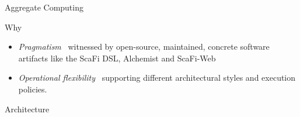 \documentclass[presentation, 9pt]{beamer}\mode<presentation>{\usetheme{AMSBolognaFC}}
\begin{document}
\begin{frame}[allowframebreaks]{Aggregate Computing}
\begin{block}{Why}
\begin{itemize}
	\item \emph{Pragmatism} \faArrowRight \, witnessed by open-source, maintained, concrete software artifacts like the ScaFi DSL, Alchemist and {\sc{}ScaFi-Web}
	\item \emph{Operational flexibility} \faArrowRight \, supporting different architectural styles and execution policies.
\end{itemize}
\end{block}
\end{frame}

\begin{frame}{Architecture}
\centering
{}
\end{frame}
\end{document}
